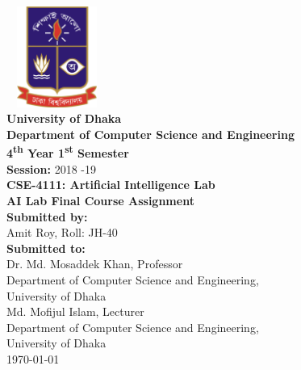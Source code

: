 \documentclass[12pt]{article}
\begin{document}
	\thispagestyle{empty}
	\begin{center}
		\includegraphics[width=3.3cm,height=3.3cm,keepaspectratio]{images/du.png}\\\bigskip
		\Huge \textbf{University of Dhaka}\\
		\LARGE
		\bigskip\textbf{
		\fontsize{19}{1}\selectfont Department of Computer Science and Engineering}\\
		\bigskip
		\bigskip
		\textbf{4\textsuperscript{th} Year 1\textsuperscript{st} Semester}\\
		\textbf{\LARGE Session:} {\Large 2018 -19\\}
		\bigskip
		\bigskip
		\textbf{ \fontsize{16}{1}\selectfont CSE-4111: Artificial Intelligence Lab}\\
		\bigskip
		\bigskip
		\textbf{\LARGE AI Lab Final Course Assignment }\\ 
		\bigskip
		\bigskip
		\textbf{\LARGE Submitted by:}\\ 
		\bigskip
		\Large Amit Roy, Roll: JH-40\\
		\bigskip
		\textbf{\LARGE Submitted to:}\\ 
		\bigskip
		\Large Dr. Md. Mosaddek Khan, Professor\\
		\Large Department of Computer Science and Engineering,\\University of Dhaka\\
		\bigskip
		\Large Md. Mofijul Islam, Lecturer\\
		\Large Department of Computer Science and Engineering,\\University of Dhaka\\
		\bigskip
		\Large \today\\
		\newpage
	\end{center}
\newpage
%
\end{document}
